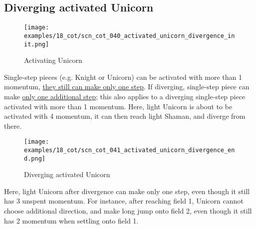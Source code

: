 \clearpage %

\subsection*{Diverging activated Unicorn}
\label{sec:Conquest of Tlalocan/Divergence/Diverging activated Unicorn}

\vspace*{-1.4\baselineskip}
\noindent
\begin{figure}[!h]
\texttt{[image: examples/18\_cot/scn\_cot\_040\_activated\_unicorn\_divergence\_init.png]}
\vspace*{-1.3\baselineskip}
\caption{Activating Unicorn}
\label{fig:scn_cot_040_activated_unicorn_divergence_init}
\end{figure}

\vspace*{-0.5\baselineskip}
Single-step pieces (e.g. Knight or Unicorn) can be activated with more than 1 momentum,
\hyperref[fig:scn_mv_35_single_step_piece_momentum]{they still can make only one step}.
If diverging, single-step piece can make
\hyperref[fig:scn_cot_038_diverging_unicorn_init]{only one additional step}; this also
applies to a diverging single-step piece activated with more than 1 momentum.\newline
\indent
Here, light Unicorn is about to be activated with 4 momentum, it can then reach light
Shaman, and diverge from there.

\clearpage %

\vspace*{-2.1\baselineskip}
\noindent
\begin{figure}[!h]
\texttt{[image: examples/18\_cot/scn\_cot\_041\_activated\_unicorn\_divergence\_end.png]}
\vspace*{-1.3\baselineskip}
\caption{Diverging activated Unicorn}
\label{fig:scn_cot_041_activated_unicorn_divergence_end}
\end{figure}

\vspace*{-0.4\baselineskip}
Here, light Unicorn after divergence can make only one step, even though it still
has 3 unspent momentum. For instance, after reaching field 1, Unicorn cannot choose
additional direction, and make long jump onto field 2, even though it still has 2
momentum when settling onto field 1.

